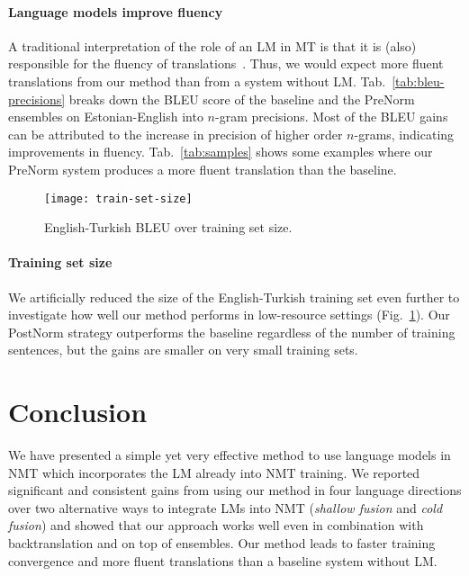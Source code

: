 \documentclass[11pt,a4paper]{article}
\begin{document}
\paragraph{Language models improve fluency}

A traditional interpretation of the role of an LM in MT is that it is (also) responsible for the fluency of translations~\citep{smt}. Thus, we would expect more fluent translations from our method than from a system without LM. Tab.~\ref{tab:bleu-precisions} breaks down the BLEU score of the baseline and the {\sc PreNorm} ensembles on Estonian-English into $n$-gram precisions. Most of the BLEU gains can be attributed to the increase in precision of higher order $n$-grams, indicating improvements in fluency. Tab.~\ref{tab:samples} shows some examples where our {\sc PreNorm} system produces a more fluent translation than the baseline.

\begin{figure}[t!]
\centering
\texttt{[image: train-set-size]}
\caption{English-Turkish BLEU over training set size.}\label{fig:train-set-size}
\end{figure}

\paragraph{Training set size}

We artificially reduced the size of the English-Turkish training set even further to investigate how well our method performs in low-resource settings (Fig.~\ref{fig:train-set-size}). Our {\sc PostNorm} strategy outperforms the baseline regardless of the number of training sentences, but the gains are smaller on very small training sets.

\section{Conclusion}

We have presented a simple yet very effective method to use language models in NMT which incorporates the LM already into NMT training. We reported significant and consistent gains from using our method in four language directions over two alternative ways to integrate LMs into NMT ({\em shallow fusion} and {\em cold fusion}) and showed that our approach works well even in combination with backtranslation and on top of ensembles. Our method leads to faster training convergence and more fluent translations than a baseline system without LM.





\end{document}
